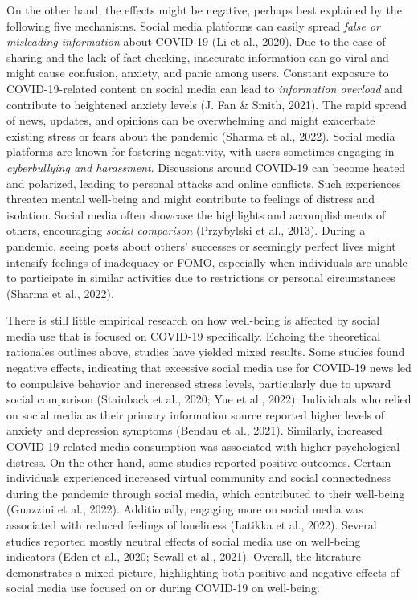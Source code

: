 \documentclass[
  man,mask,floatsintext]{apa7}
\begin{document}
On the other hand, the effects might be negative, perhaps best explained by the following five mechanisms.
Social media platforms can easily spread \emph{false or misleading information} about COVID-19 (Li et al., 2020).
Due to the ease of sharing and the lack of fact-checking, inaccurate information can go viral and might cause confusion, anxiety, and panic among users.
Constant exposure to COVID-19-related content on social media can lead to \emph{information overload} and contribute to heightened anxiety levels (J. Fan \& Smith, 2021).
The rapid spread of news, updates, and opinions can be overwhelming and might exacerbate existing stress or fears about the pandemic (Sharma et al., 2022).
Social media platforms are known for fostering negativity, with users sometimes engaging in \emph{cyberbullying and harassment}.
Discussions around COVID-19 can become heated and polarized, leading to personal attacks and online conflicts.
Such experiences threaten mental well-being and might contribute to feelings of distress and isolation.
Social media often showcase the highlights and accomplishments of others, encouraging \emph{social comparison} (Przybylski et al., 2013).
During a pandemic, seeing posts about others' successes or seemingly perfect lives might intensify feelings of inadequacy or FOMO, especially when individuals are unable to participate in similar activities due to restrictions or personal circumstances (Sharma et al., 2022).

There is still little empirical research on how well-being is affected by social media use that is focused on COVID-19 specifically.
Echoing the theoretical rationales outlines above, studies have yielded mixed results.
Some studies found negative effects, indicating that excessive social media use for COVID-19 news led to compulsive behavior and increased stress levels, particularly due to upward social comparison (Stainback et al., 2020; Yue et al., 2022).
Individuals who relied on social media as their primary information source reported higher levels of anxiety and depression symptoms (Bendau et al., 2021).
Similarly, increased COVID-19-related media consumption was associated with higher psychological distress.
On the other hand, some studies reported positive outcomes.
Certain individuals experienced increased virtual community and social connectedness during the pandemic through social media, which contributed to their well-being (Guazzini et al., 2022).
Additionally, engaging more on social media was associated with reduced feelings of loneliness (Latikka et al., 2022).
Several studies reported mostly neutral effects of social media use on well-being indicators (Eden et al., 2020; Sewall et al., 2021).
Overall, the literature demonstrates a mixed picture, highlighting both positive and negative effects of social media use focused on or during COVID-19 on well-being.
\end{document}
